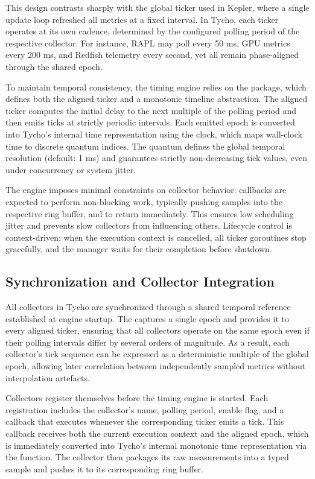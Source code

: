 This design contrasts sharply with the global ticker used in Kepler, where a single update loop refreshed all metrics at a fixed interval.  
In Tycho, each ticker operates at its own cadence, determined by the configured polling period of the respective collector.  
For instance, RAPL may poll every 50 ms, GPU metrics every 200 ms, and Redfish telemetry every second, yet all remain phase-aligned through the shared epoch.

To maintain temporal consistency, the timing engine relies on the  package, which defines both the aligned ticker and a monotonic timeline abstraction.  
The aligned ticker computes the initial delay to the next multiple of the polling period and then emits ticks at strictly periodic intervals.  
Each emitted epoch is converted into Tycho’s internal time representation using the  clock, which maps wall-clock time to discrete quantum indices.  
The quantum defines the global temporal resolution (default: 1 ms) and guarantees strictly non-decreasing tick values, even under concurrency or system jitter.

The engine imposes minimal constraints on collector behavior: callbacks are expected to perform non-blocking work, typically pushing samples into the respective ring buffer, and to return immediately.  
This ensures low scheduling jitter and prevents slow collectors from influencing others.  
Lifecycle control is context-driven: when the execution context is cancelled, all ticker goroutines stop gracefully, and the manager waits for their completion before shutdown.

\subsection{Synchronization and Collector Integration}
\label{subsec:tycho_timing_sync}

All collectors in Tycho are synchronized through a shared temporal reference established at engine startup.  
The  captures a single epoch and provides it to every aligned ticker, ensuring that all collectors operate on the same epoch even if their polling intervals differ by several orders of magnitude.  
As a result, each collector’s tick sequence can be expressed as a deterministic multiple of the global epoch, allowing later correlation between independently sampled metrics without interpolation artefacts.

Collectors register themselves before the timing engine is started.  
Each registration includes the collector’s name, polling period, enable flag, and a  callback that executes whenever the corresponding ticker emits a tick.  
This callback receives both the current execution context and the aligned epoch, which is immediately converted into Tycho’s internal monotonic time representation via the  function.  
The collector then packages its raw measurements into a typed sample and pushes it to its corresponding ring buffer.

